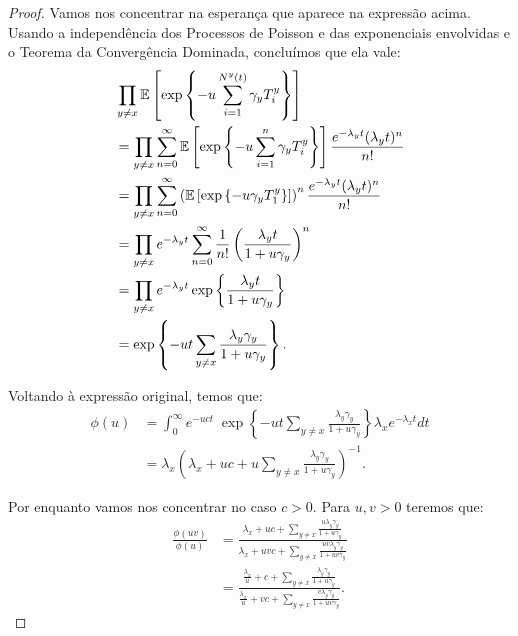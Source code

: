 \begin{proof}
  Vamos nos concentrar na esperança que aparece na expressão
  acima. Usando a independência dos Processos de Poisson e das
  exponenciais envolvidas e o Teorema da Convergência Dominada,
  concluímos que ela vale:
  \begin{align*}
    & \prod_{y \neq x} {\mathbb{E}} \left[ \exp \left\{ -u \sum_{i = 1}^{N^y(t)}
        \gamma_y T^y_i\right\} \right]\\
    &= \prod_{y \neq x} \sum_{n=0}^{\infty} {\mathbb{E}} \left[ \exp \left\{ -u
        \sum_{i = 1}^{n} \gamma_y T^y_i\right\} \right]
    \frac{e^{-\lambda_y
        t}(\lambda_yt)^n}{n!}\\
    &= \prod_{y \neq x} \sum_{n=0}^{\infty} \left( {\mathbb{E}} \left[ \exp
        \left\{ -u \gamma_y T^y_1 \right\} \right] \right)^{n}
    \frac{e^{-\lambda_y t}(\lambda_yt)^n}{n!}\\
    &= \prod_{y \neq x} e^{-\lambda_y t}
    \sum_{n=0}^{\infty} \frac{1}{n!}
    \left(  \frac{\lambda_y t}{1 + u \gamma_y}  \right)^{n}\\
    &= \prod_{y \neq x} e^{-\lambda_y t} \exp \left\{
    \frac{\lambda_y t}{1 + u \gamma_y}  \right\} \\
    &=\exp   \left\{  -u t \sum_{y \neq x} 
      \frac{\lambda_y \gamma_y}{1 + u\gamma_y} \right\}.
  \end{align*}

  Voltando à expressão original, temos que:
  \begin{align*}
    \phi(u)
    &= \int_0^\infty
    e^{-u c t} \;
    \exp   \left\{  -u t \sum_{y \neq x} 
      \frac{\lambda_y \gamma_y}{1 + u\gamma_y} \right\}
    \lambda_x e^{-\lambda_x t} d t \\
    &= \lambda_x \left( \lambda_x + uc + u \sum_{y \neq x}
      \frac{\lambda_y \gamma_y}{1 + u\gamma_y} \right)^{-1}.
  \end{align*}

  Por enquanto vamos nos concentrar no caso $c > 0$. Para $u, v > 0$
  teremos que:
  \begin{align*}
    \frac{\phi(uv)}{\phi (u)} &= \frac{\lambda_x + uc + \sum_{y \neq
        x} \frac{u \lambda_y\gamma_y}{1 + u \gamma_y}} {\lambda_x + u
      v c + \sum_{y \neq x} \frac{u v
        \lambda_y\gamma_y}{1 + u v \gamma_y}} \\
    &= \frac{\frac{\lambda_x}{u} + c + \sum_{y \neq x}
      \frac{\lambda_y\gamma_y}{1 + u \gamma_y}} {\frac{\lambda_x}{u} +
      v c + \sum_{y \neq x} \frac{v
        \lambda_y\gamma_y}{1 + u v \gamma_y}}.
  \end{align*}


\end{proof}

